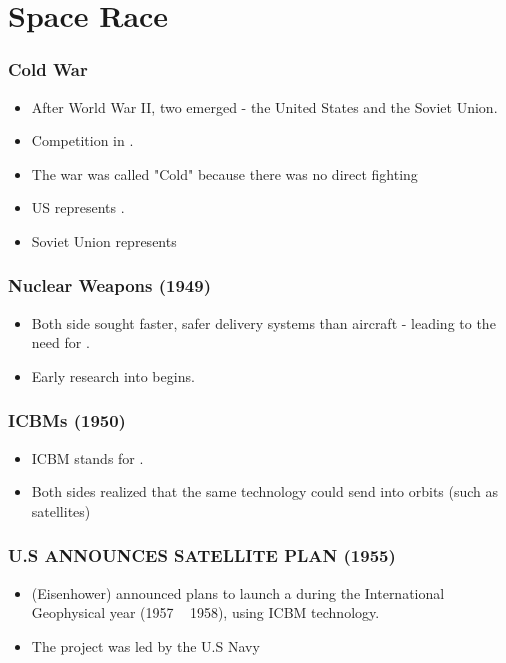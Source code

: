\documentclass[10pt]{article}
\newcommand{\fillin}[1]{\uline{\hspace{#1}}}
\begin{document}
\section*{Space Race}
\subsubsection*{Cold War}
\begin{itemize}
    \item After World War II, two \fillin{4cm} emerged - the United States and the Soviet Union.
    \item Competition in \fillin{13cm}.
    \item The war was called "Cold" because there was no direct fighting
    \item US represents \fillin{10cm}.
    \item Soviet Union represents \fillin{4cm}
\end{itemize}

\subsubsection*{Nuclear Weapons (1949)}
\begin{itemize}
    \item Both side sought faster, safer delivery systems than aircraft - \newline leading to the need for \fillin{3cm}.
    \item Early research into \fillin{5cm} begins.
\end{itemize}

\subsubsection*{ICBMs (1950)}
\begin{itemize}
    \item ICBM stands for \fillin{8cm}.
    \item Both sides realized that the same technology could send \fillin{5cm} into orbits (such as satellites)
\end{itemize}

\subsubsection*{U.S ANNOUNCES SATELLITE PLAN (1955)}
\begin{itemize}
    \item (Eisenhower) announced plans to launch a \fillin{6cm} during the International Geophysical year (1957 ~ 1958), using ICBM technology.
    \item The project was led by the U.S Navy
\end{itemize}
\end{document}
